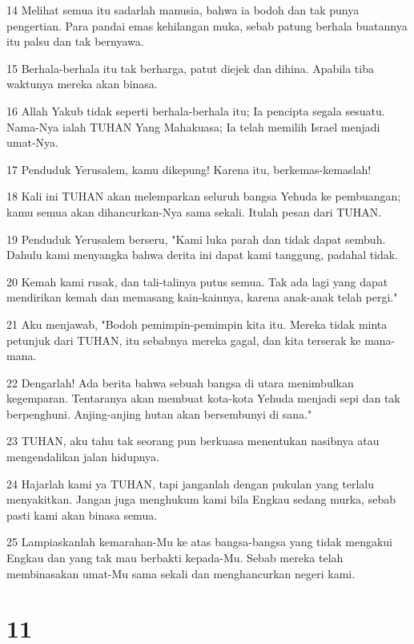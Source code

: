 \par 14 Melihat semua itu sadarlah manusia, bahwa ia bodoh dan tak punya pengertian. Para pandai emas kehilangan muka, sebab patung berhala buatannya itu palsu dan tak bernyawa.
\par 15 Berhala-berhala itu tak berharga, patut diejek dan dihina. Apabila tiba waktunya mereka akan binasa.
\par 16 Allah Yakub tidak seperti berhala-berhala itu; Ia pencipta segala sesuatu. Nama-Nya ialah TUHAN Yang Mahakuasa; Ia telah memilih Israel menjadi umat-Nya.
\par 17 Penduduk Yerusalem, kamu dikepung! Karena itu, berkemas-kemaslah!
\par 18 Kali ini TUHAN akan melemparkan seluruh bangsa Yehuda ke pembuangan; kamu semua akan dihancurkan-Nya sama sekali. Itulah pesan dari TUHAN.
\par 19 Penduduk Yerusalem berseru, "Kami luka parah dan tidak dapat sembuh. Dahulu kami menyangka bahwa derita ini dapat kami tanggung, padahal tidak.
\par 20 Kemah kami rusak, dan tali-talinya putus semua. Tak ada lagi yang dapat mendirikan kemah dan memasang kain-kainnya, karena anak-anak telah pergi."
\par 21 Aku menjawab, "Bodoh pemimpin-pemimpin kita itu. Mereka tidak minta petunjuk dari TUHAN, itu sebabnya mereka gagal, dan kita terserak ke mana-mana.
\par 22 Dengarlah! Ada berita bahwa sebuah bangsa di utara menimbulkan kegemparan. Tentaranya akan membuat kota-kota Yehuda menjadi sepi dan tak berpenghuni. Anjing-anjing hutan akan bersembunyi di sana."
\par 23 TUHAN, aku tahu tak seorang pun berkuasa menentukan nasibnya atau mengendalikan jalan hidupnya.
\par 24 Hajarlah kami ya TUHAN, tapi janganlah dengan pukulan yang terlalu menyakitkan. Jangan juga menghukum kami bila Engkau sedang murka, sebab pasti kami akan binasa semua.
\par 25 Lampiaskanlah kemarahan-Mu ke atas bangsa-bangsa yang tidak mengakui Engkau dan yang tak mau berbakti kepada-Mu. Sebab mereka telah membinasakan umat-Mu sama sekali dan menghancurkan negeri kami.

\chapter{11}

